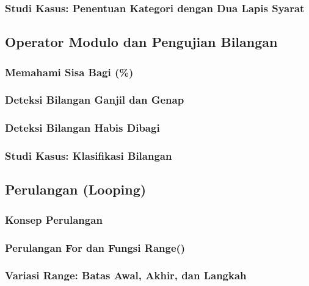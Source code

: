 \documentclass[12pt,a4paper]{article}
\begin{document}
\subsubsection{Studi Kasus: Penentuan Kategori dengan Dua Lapis Syarat}

\subsection{Operator Modulo dan Pengujian Bilangan}

\subsubsection{Memahami Sisa Bagi (\%)}

\subsubsection{Deteksi Bilangan Ganjil dan Genap}

\subsubsection{Deteksi Bilangan Habis Dibagi}

\subsubsection{Studi Kasus: Klasifikasi Bilangan}

\subsection{Perulangan (Looping)}

\subsubsection{Konsep Perulangan}

\subsubsection{Perulangan For dan Fungsi Range()}

\subsubsection{Variasi Range: Batas Awal, Akhir, dan Langkah}
\end{document}
